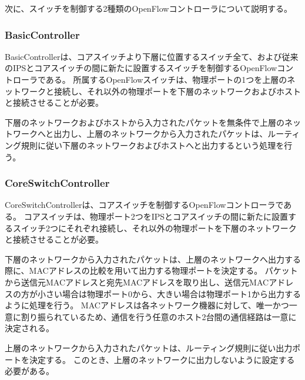 次に、スイッチを制御する2種類のOpenFlowコントローラについて説明する。

\subsubsection{BasicController}

BasicControllerは、コアスイッチより下層に位置するスイッチ全て、および従来のIPSとコアスイッチの間に新たに設置するスイッチを制御するOpenFlowコントローラである。
所属するOpenFlowスイッチは、物理ポートの1つを上層のネットワークと接続し、それ以外の物理ポートを下層のネットワークおよびホストと接続させることが必要。

下層のネットワークおよびホストから入力されたパケットを無条件で上層のネットワークへと出力し、上層のネットワークから入力されたパケットは、ルーティング規則に従い下層のネットワークおよびホストへと出力するという処理を行う。

\subsubsection{CoreSwitchController}

CoreSwitchControllerは、コアスイッチを制御するOpenFlowコントローラである。
コアスイッチは、物理ポート2つをIPSとコアスイッチの間に新たに設置するスイッチ2つにそれぞれ接続し、それ以外の物理ポートを下層のネットワークと接続させることが必要。

下層のネットワークから入力されたパケットは、上層のネットワークへ出力する際に、MACアドレスの比較を用いて出力する物理ポートを決定する。
パケットから送信元MACアドレスと宛先MACアドレスを取り出し、送信元MACアドレスの方が小さい場合は物理ポート0から、大きい場合は物理ポート1から出力するように処理を行う。
MACアドレスは各ネットワーク機器に対して、唯一かつ一意に割り振られているため、通信を行う任意のホスト2台間の通信経路は一意に決定される。

上層のネットワークから入力されたパケットは、ルーティング規則に従い出力ポートを決定する。
このとき、上層のネットワークに出力しないように設定する必要がある。